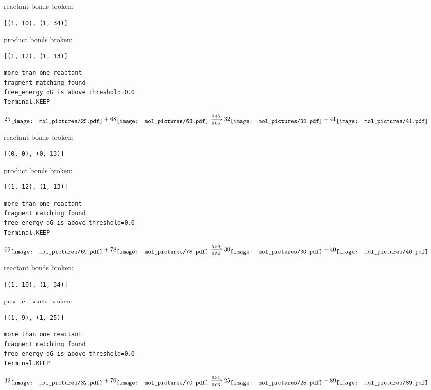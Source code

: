 \documentclass{article}
\begin{document}
reactant bonds broken:\begin{verbatim}
[(1, 10), (1, 34)]
\end{verbatim}
product bonds broken:\begin{verbatim}
[(1, 12), (1, 13)]
\end{verbatim}




\vspace{1cm}
\begin{verbatim}
more than one reactant
fragment matching found
free_energy dG is above threshold=0.0
Terminal.KEEP
\end{verbatim}
$$
25
\raisebox{-.5\height}{\texttt{[image: mol\_pictures/25.pdf]}}
+
68
\raisebox{-.5\height}{\texttt{[image: mol\_pictures/68.pdf]}}
\xrightarrow[0.05]{0.45}
32
\raisebox{-.5\height}{\texttt{[image: mol\_pictures/32.pdf]}}
+
41
\raisebox{-.5\height}{\texttt{[image: mol\_pictures/41.pdf]}}
$$


reactant bonds broken:\begin{verbatim}
[(0, 0), (0, 13)]
\end{verbatim}
product bonds broken:\begin{verbatim}
[(1, 12), (1, 13)]
\end{verbatim}




\vspace{1cm}
\begin{verbatim}
more than one reactant
fragment matching found
free_energy dG is above threshold=0.0
Terminal.KEEP
\end{verbatim}
$$
69
\raisebox{-.5\height}{\texttt{[image: mol\_pictures/69.pdf]}}
+
78
\raisebox{-.5\height}{\texttt{[image: mol\_pictures/78.pdf]}}
\xrightarrow[0.54]{5.39}
30
\raisebox{-.5\height}{\texttt{[image: mol\_pictures/30.pdf]}}
+
40
\raisebox{-.5\height}{\texttt{[image: mol\_pictures/40.pdf]}}
$$


reactant bonds broken:\begin{verbatim}
[(1, 10), (1, 34)]
\end{verbatim}
product bonds broken:\begin{verbatim}
[(1, 9), (1, 25)]
\end{verbatim}




\vspace{1cm}
\begin{verbatim}
more than one reactant
fragment matching found
free_energy dG is above threshold=0.0
Terminal.KEEP
\end{verbatim}
$$
32
\raisebox{-.5\height}{\texttt{[image: mol\_pictures/32.pdf]}}
+
70
\raisebox{-.5\height}{\texttt{[image: mol\_pictures/70.pdf]}}
\xrightarrow[0.03]{0.31}
25
\raisebox{-.5\height}{\texttt{[image: mol\_pictures/25.pdf]}}
+
89
\raisebox{-.5\height}{\texttt{[image: mol\_pictures/89.pdf]}}
$$
\end{document}
